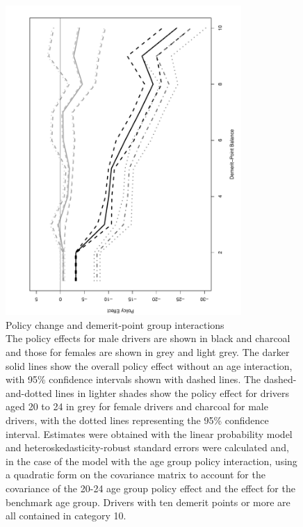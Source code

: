 \begin{figure}
\centering
\includegraphics[width=0.8\textwidth, angle =270]{Figures/points_fig_with_age_int}
\caption{Policy change and demerit-point group interactions \\
The policy effects for male drivers are shown in black and charcoal
and those for females are shown in grey and light grey.
The darker solid lines show the overall policy effect without an age interaction,
with 95\% confidence intervals shown with dashed lines.
The dashed-and-dotted lines in lighter shades show the policy effect 
for drivers aged 20 to 24
in grey for female drivers and charcoal for male drivers,
with the dotted lines representing the 95\% confidence interval.
Estimates were obtained with the linear probability model
and heteroskedasticity-robust standard errors were calculated 
and, in the case of the model with the age group policy interaction,
using a quadratic form on the covariance matrix to account for the covariance of the
20-24 age group policy effect and the effect for the benchmark age group.
Drivers with ten demerit points or more are all contained in category 10.
}\label{fig:points_fig_with_age_int}
\end{figure}
